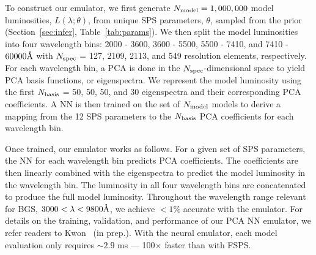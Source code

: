 
To construct our emulator, we first generate $N_{\rm model} = 1,000,000$
model luminosities, $L(\lambda;\theta)$, from unique SPS parameters,
$\theta$, sampled from the prior (Section~\ref{sec:infer},
Table~\ref{tab:params}).
We then split the model luminosities into four wavelength bins: 2000 - 3600,
3600 - 5500, 5500 - 7410, and 7410 - $60000\AA$ with $N_{\rm spec}$ = 127, 2109,
2113, and 549 resolution elements, respectively.
For each wavelength bin, a PCA is done in the $N_{\rm spec}$-dimensional
space to yield PCA basis functions, or eigenspectra. 
We represent the model luminosity using the first $N_{\rm basis}$ = 50, 50, 50, and 30
eigenspectra and their corresponding PCA coefficients. 
A NN is then trained on the set of $N_{\rm model}$ models to
derive a mapping from the 12 SPS parameters to the $N_{\rm basis}$ PCA
coefficients for each wavelength bin. 


Once trained, our emulator works as follows.
For a given set of SPS parameters, the NN for each wavelength bin predicts
PCA coefficients. 
The coefficients are then linearly combined with the eigenspectra to
predict the model luminosity in the wavelength bin. 
The luminosity in all four wavelength bins are concatenated to produce the
full model luminosity. 
Throughout the wavelength range relevant for BGS, $3000 < \lambda < 9800\AA$,
we achieve $< 1\%$ accurate with the emulator. 
For details on the training, validation, and performance of our PCA NN
emulator, we refer readers to Kwon \etal~(in prep.). 
With the neural emulator, each model evaluation only requires 
${\sim}2.9$ ms --- 100$\times$ faster than with FSPS.

